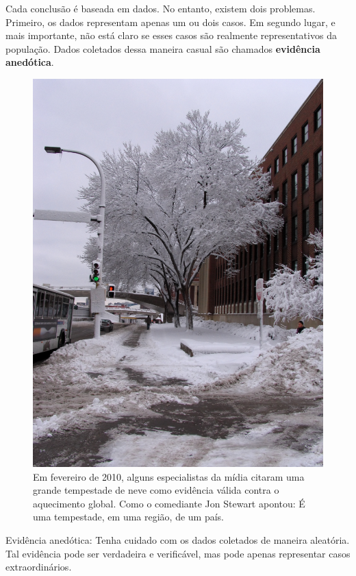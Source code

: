 \documentclass[
]{book}
\theoremstyle{definition}
\theoremstyle{definition}
\theoremstyle{definition}
\theoremstyle{definition}
\theoremstyle{remark}
\begin{document}
Cada conclusão é baseada em dados. No entanto, existem dois problemas. Primeiro, os dados representam apenas um ou dois casos. Em segundo lugar, e mais importante, não está claro se esses casos são realmente representativos da população. Dados coletados dessa maneira casual são chamados \textbf{evidência anedótica}.

\begin{figure}
\includegraphics[width=11.11in]{images/c1/mnWinter} \caption{Em fevereiro de 2010, alguns especialistas da mídia citaram uma grande tempestade de neve como evidência válida contra o aquecimento global. Como o comediante Jon Stewart apontou: É uma tempestade, em uma região, de um país.}\label{fig:mnWinter}
\end{figure}

Evidência anedótica: Tenha cuidado com os dados coletados de maneira aleatória. Tal evidência pode ser verdadeira e verificável, mas pode apenas representar casos extraordinários.
\end{document}
